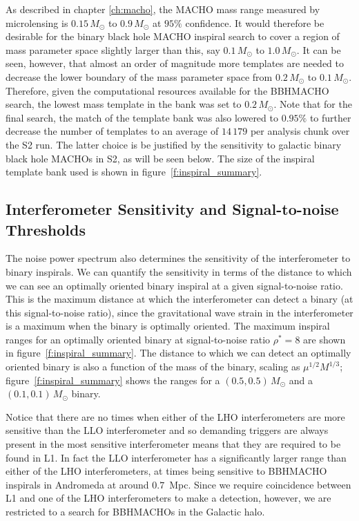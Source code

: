 As described in chapter \ref{ch:macho}, the MACHO mass range measured by
microlensing is $0.15\,M_\odot$ to $0.9\,M_\odot$ at $95\%$ confidence. It
would therefore be desirable for the binary black hole MACHO inspiral search
to cover a region of mass parameter space slightly larger than this, say
$0.1\,M_\odot$ to $1.0\,M_\odot$.  It can be seen, however, that almost an
order of magnitude more templates are needed to decrease the lower boundary of
the mass parameter space from $0.2\,M_\odot$ to $0.1\,M_\odot$.  Therefore,
given the computational resources available for the BBHMACHO search, the
lowest mass template in the bank was set to $0.2\,M_\odot$. Note that for the
final search, the match of the template bank was also lowered to $0.95\%$ to
further decrease the number of templates to an average of $14\,179$ per
analysis chunk over the S2 run.  The latter choice is be justified by the
sensitivity to galactic binary black hole MACHOs in S2, as will be seen below.
The size of the inspiral template bank used is shown in
figure~\ref{f:inspiral_summary}.
 
\subsection{Interferometer Sensitivity and Signal-to-noise Thresholds}
\label{ss:snrthreshold}

The noise power spectrum also determines the sensitivity of the interferometer
to binary inspirals. We can quantify the sensitivity in terms of the distance
to which we can see an optimally oriented binary inspiral at a given
signal-to-noise ratio. This is the maximum distance at which the
interferometer can detect a binary (at this signal-to-noise ratio), since the
gravitational wave strain in the interferometer is a maximum when the binary
is optimally oriented.  The maximum inspiral ranges for an optimally oriented
binary at signal-to-noise ratio $\rho^\ast = 8$ are shown in
figure~\ref{f:inspiral_summary}.  The distance to which we can detect an
optimally oriented binary is also a function of the mass of the binary,
scaling as $\mu^{1/2}M^{1/3}$; figure~\ref{f:inspiral_summary} shows the
ranges for a $(0.5,0.5)\,M_\odot$ and a $(0.1,0.1)\,M_\odot$ binary.

Notice that there are no times when either of the LHO interferometers are more
sensitive than the LLO interferometer and so demanding triggers are always
present in the most sensitive interferometer means that they are required to
be found in L1. In fact the LLO interferometer has a significantly larger
range than either of the LHO interferometers, at times being sensitive to
BBHMACHO inspirals in Andromeda at around $0.7$~Mpc.  Since we require
coincidence between L1 and one of the LHO interferometers to make a detection,
however, we are restricted to a search for BBHMACHOs in the Galactic halo.  

